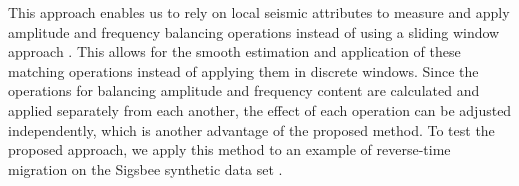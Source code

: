 This approach enables us to rely on local seismic attributes to measure and apply amplitude and frequency balancing operations instead of using a sliding window approach \cite[]{attr}.
This allows for the smooth estimation and application of these matching operations instead of applying them in discrete windows.
Since the operations for balancing amplitude and frequency content are calculated and applied separately from each another, the effect of each 
operation
can be adjusted independently, which is another advantage of the proposed method.
To test the proposed approach, we apply this method to an example of reverse-time migration on the Sigsbee synthetic data set \cite[]{sigsbee}. 


